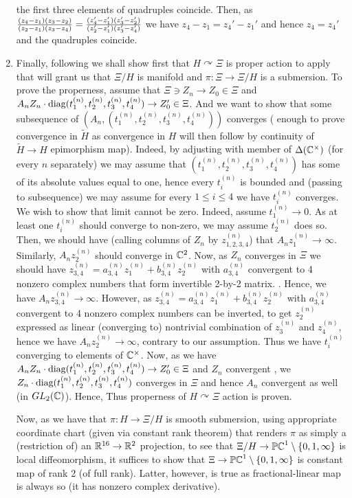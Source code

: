 \documentclass[8pt]{article} %
\newcommand{\diag}{\mbox{\normalfont{diag}}}
\begin{document}
\begin{enumerate}
		the first three elements of quadruples coincide. Then, as 
		$\frac{(z_4-z_1)(z_3-z_2)}{(z_2-z_1)(z_3-z_4)}=\frac{(z'_4-z'_1)(z'_3-z'_2)}{(z'_2-z'_1)(z'_3-z'_4)}$ we have $z_4-z_1=z_4'-z_1'$ and hence
		$z_4=z_4'$ and the quadruples coincide.
	\item Finally, following \cite[Chapter 9]{lee} we shall show first that $H\curvearrowright\Xi$ is proper
		action to apply \cite[Theorem 9.16]{lee} that will grant us that $\Xi/H$ is manifold and
		$\pi:\Xi\to \Xi/H$ is a submersion. To prove the properness, assume that $\Xi\ni Z_n\to Z_0\in\Xi$
		and $A_nZ_n\cdot\diag(t_1^{ (n) },t_2^{ (n) },t_3^{ (n) },t_4^{ (n) })\to Z'_0\in\Xi$. And we want
		to show that some subsequence of $(A_n,(t_1^{ (n) },t_2^{ (n) },t_3^{ (n) },t_4^{ (n) }))$ converges (
		enough to prove convergence in $\widetilde{H}$ as convergence in $H$ will then follow by continuity of
		$\widetilde{ H }\to H$ epimorphism map).
		Indeed, by adjusting with member of $\Delta(\mathbb{C}^\times)$ (for every $n$ separately) we may assume that
		$(t_1^{ (n) },t_2^{ (n) },t_3^{ (n) },t_4^{ (n) })$ has some of its absolute values equal to one, hence
		every $t_i^{ (n) }$ is bounded and (passing to subsequence) we may assume for every $1\leq i\leq 4$ 
		we have $t_i^{ (n) }$ converges. We wish to show that limit cannot be zero. Indeed, assume $t_1^{ (n) }\to0$.
		As at least one $t_i^{ (n) }$ should converge to non-zero, we may assume $t_2^{ (n) }$ does so.
		Then, we should have (calling columns of $Z_n$ by $z_{ 1,2,3,4 }^{ (n) }$) that $A_nz_1^{ (n) }\to\infty$.
		Similarly, $A_nz_2^{ (n) }$ should converge in $\mathbb{C}^2$. Now, as $Z_n$ converges in $\Xi$ we should have
		$z_{ 3,4 }^{ (n) }=a_{ 3,4 }^{ (n) }z_1^{ (n) }+b_{ 3,4 }^{ (n) }z_2^{ (n) }$
		with $a_{ 3,4 }^{ (n) }$
		convergent to 4 nonzero complex numbers that form invertible 2-by-2 matrix.
		. Hence, we have $A_nz_{ 3,4 }^{ (n) }\to\infty$. However, as
		$z_{ 3,4 }^{ (n) }=a_{ 3,4 }^{ (n) }z_1^{ (n) }+b_{ 3,4 }^{ (n) }z_2^{ (n) }$ 
		with $a_{ 3,4 }^{ (n) }$
		convergent to 4 nonzero complex numbers can be inverted, to get $z_2^{ (n) }$ expressed as linear (converging to)
		nontrivial combination of $z_3^{ (n) }$ and $z_4^{ (n) }$, hence we have $A_nz_2^{ (n) }\to\infty$, contrary to our
		assumption. Thus we have $t_i^{ (n)}$ converging to elements of $\mathbb{C}^\times$. Now, as we have
		$A_nZ_n\cdot\diag(t_1^{ (n) },t_2^{ (n) },t_3^{ (n) },t_4^{ (n) })\to Z'_0\in\Xi$ and $Z_n$ convergent
		, we $Z_n\cdot\diag(t_1^{ (n) },t_2^{ (n) },t_3^{ (n) },t_4^{ (n) })$ converges in $\Xi$  and hence
		$A_n$ convergent as well (in $GL_2(\mathbb{C})$). Hence, 
		Thus properness of $H\curvearrowright\Xi$ action is proven.\par
		Now, as we have that $\pi:H\to\Xi/H$ is	smooth submersion, using appropriate coordinate chart
		(given via constant rank theorem) that renders $\pi$ as simply a (restriction of) an $\mathbb{R}^{ 16 }\to\mathbb{R}^2$
		projection, to see that $\Xi/H\to\mathbb{PC}^1\setminus\left\{ 0,1,\infty \right\}$ is local diffeomorphism,
		it suffices to show that $\Xi\to\mathbb{PC}^1\setminus\left\{ 0,1,\infty \right\}$ is constant map of rank 2 (of full rank).
		Latter, however, is true as fractional-linear map is always so (it has nonzero complex derivative).
\end{enumerate}
\end{document}
